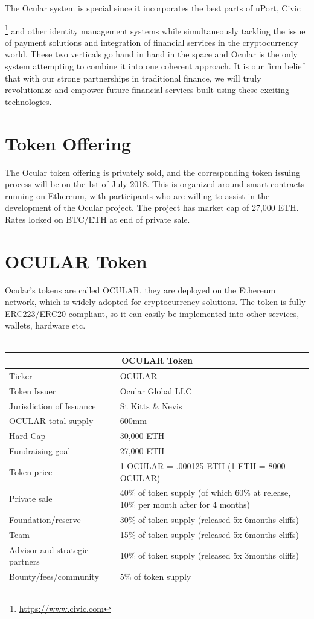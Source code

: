 \documentclass[a4paper]{article}
\begin{document}
The Ocular system is special since it incorporates the best parts of uPort, Civic{\footnote{\url{https://www.civic.com}} and other identity management systems while simultaneously tackling the issue of payment solutions and integration of financial services in the cryptocurrency world. These two verticals go hand in hand in the space and Ocular is the only system attempting to combine it into one coherent approach. It is our firm belief that with our strong partnerships in traditional finance, we will truly revolutionize and empower future financial services built using these exciting technologies. 

\clearpage
\section{Token Offering}
The Ocular token offering is privately sold, and the corresponding token issuing process will be on the 1st of July 2018. This is organized around smart contracts running on Ethereum, with participants who are willing to assist in the development of the Ocular project. The project has market cap of 27,000 ETH. Rates locked on BTC/ETH at end of private sale.

\section{OCULAR Token}
Ocular’s tokens are called OCULAR, they are deployed on the Ethereum network, which is widely adopted for cryptocurrency solutions.  The token is fully ERC223/ERC20 compliant, so it can easily be implemented into other services, wallets, hardware etc.
\\
\\
{
\begin{tabular}{ |p{4.1cm}|p{5.3cm}|  }
\hline
\multicolumn{2}{|c|}{OCULAR Token} \\
\hline
Ticker & OCULAR \\
Token Issuer & Ocular Global LLC \\
Jurisdiction of Issuance & St Kitts \& Nevis\\
OCULAR total supply & 600mm \\
Hard Cap    &30,000 ETH \\
Fundraising goal & 27,000 ETH \\
Token price & 1 OCULAR = .000125 ETH (1 ETH = 8000 OCULAR)    \\
Private sale & 40\% of token supply (of which 60\% at release, 10\% per month after for 4 months)  \\
Foundation/reserve & 30\% of token supply (released 5x 6months cliffs) \\
Team & 15\% of token supply (released 5x 6months cliffs) \\
Advisor and strategic partners & 10\% of token supply (released 5x 3months cliffs) \\
Bounty/fees/community & 5\% of token supply \\
\hline
\end{tabular}

}}
\end{document}
